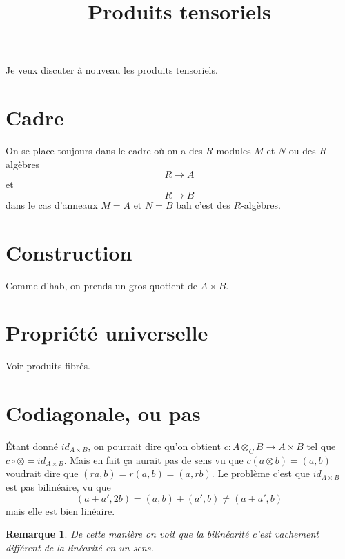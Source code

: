 \documentclass[a4paper,12pt]{article}
\title{Produits tensoriels}
\date{}
\theoremstyle{plain}
\newtheorem{rem}{Remarque}
\theoremstyle{definition}
\theoremstyle{remark}
\begin{document}
\maketitle
Je veux discuter à nouveau les produits tensoriels.
\section{Cadre}
On se place toujours dans le cadre où on a des $R$-modules $M$ et 
$N$ ou des $R$-algèbres
\[R\to A\]
et
\[R\to B\]
dans le cas d'anneaux $M=A$ et $N=B$ bah c'est des $R$-algèbres.
\section{Construction}
Comme d'hab, on prends un gros quotient de $A\times B$.
\section{Propriété universelle}
Voir produits fibrés.

\section{Codiagonale, ou pas}
Étant donné $id_{A\times B}$, on pourrait dire qu'on obtient
$c\colon A\otimes_C B \to
A\times B$ tel que $c\circ \otimes =id_{A\times B}$. Mais en fait
ça aurait pas de sens vu que $c(a\otimes b)=(a,b)$ voudrait dire
que $(ra,b)=r(a,b)=(a,rb)$. Le problème c'est que $id_{A\times B}$
est pas bilinéaire, vu que 
\[(a+a',2b)=(a,b)+(a',b)\ne (a+a',b)\]
mais elle est bien linéaire.
\begin{rem}
    De cette manière on voit que la bilinéarité c'est vachement
    différent de la linéarité en un sens.
\end{rem}
\end{document}
